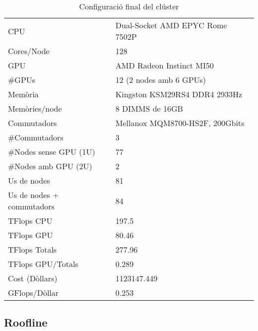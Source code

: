 \begin{table}[H]
\begin{adjustwidth}{-1.0in}{-1.0in}
\begin{center}
\begin{tabular}{l|l}
\hline
{\cellcolor[HTML]{EFEFEF}CPU}         & {\cellcolor[HTML]{EFEFEF}Dual-Socket AMD EPYC Rome 7502P} \\ 
Cores/Node                                       & 128                                             \\ 
{\color[HTML]{000000}GPU}                       & {\color[HTML]{000000}AMD Radeon Instinct MI50} \\ 
\#GPUs                                           & 12 (2 nodes amb 6 GPUs)                         \\ 
{\cellcolor[HTML]{EFEFEF}Memòria}     & {\cellcolor[HTML]{EFEFEF}Kingston KSM29RS4 DDR4 2933Hz}   \\
{\color[HTML]{000000}Memòries/node}             & {\color[HTML]{000000}8 DIMMS de 16GB}          \\ 
{\cellcolor[HTML]{EFEFEF}Commutadors} & {\cellcolor[HTML]{EFEFEF}Mellanox MQM8700-HS2F, 200Gbits} \\ 
{\color[HTML]{000000}\#Commutadors}             & {\color[HTML]{000000}3}                        \\ 
{\cellcolor[HTML]{EFEFEF}\#Nodes sense GPU (1U)}    & {\cellcolor[HTML]{EFEFEF}77}                       \\
{\color[HTML]{000000}\#Nodes amb GPU (2U)}      & {\color[HTML]{000000}2}                        \\
{\cellcolor[HTML]{EFEFEF}Us de nodes}               & {\cellcolor[HTML]{EFEFEF}81}                       \\
{\color[HTML]{000000}Us de nodes + commutadors} & {\color[HTML]{000000}84}                       \\
{\cellcolor[HTML]{EFEFEF}TFlops CPU}                & {\cellcolor[HTML]{EFEFEF}197.5}                    \\
{\color[HTML]{000000}TFlops GPU}                & {\color[HTML]{000000}80.46}                    \\ 
{\cellcolor[HTML]{EFEFEF}TFlops Totals}             & {\cellcolor[HTML]{EFEFEF}277.96}                   \\ 
{\color[HTML]{000000}TFlops GPU/Totals}         & {\color[HTML]{000000} 0.289}                    \\ 
{\cellcolor[HTML]{EFEFEF}Cost (Dòllars)}                 & {\cellcolor[HTML]{EFEFEF}1123147.449}              \\
{\color[HTML]{000000}GFlops/Dòllar}               & {\color[HTML]{000000}0.253}                    \\ \hline
\end{tabular}
\caption{Configuració final del clúster}
\end{center}
\end{adjustwidth}
\end{table}




\subsection{Roofline}



